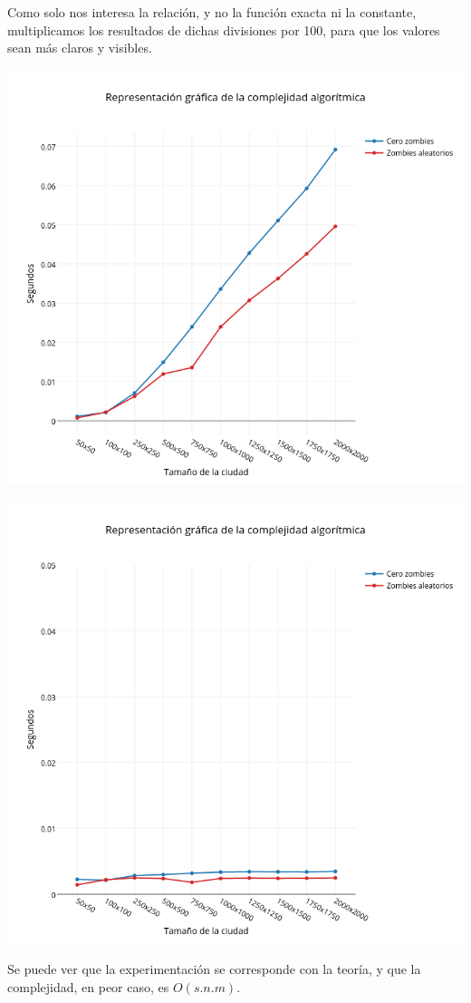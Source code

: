 Como solo nos interesa la relación, y no la función exacta ni la constante, multiplicamos los resultados de dichas divisiones por 100, para que los valores sean más claros y visibles.

\includegraphics[width=15cm,keepaspectratio=yes]{imagenes/ej2/linealizacion.png}

\includegraphics[width=15cm,keepaspectratio=yes]{imagenes/ej2/constantizacion.png}

Se puede ver que la experimentación se corresponde con la teoría, y que la complejidad, en peor caso, es $O(s.n.m)$.

